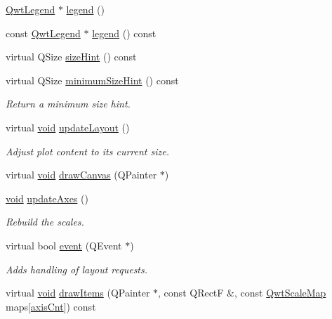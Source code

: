 \begin{DoxyCompactItemize}
\hyperlink{class_qwt_legend}{Qwt\-Legend} $\ast$ \hyperlink{class_qwt_plot_aab1f2cf0e567e09a4c4bce3181c03ba0}{legend} ()
\item 
const \hyperlink{class_qwt_legend}{Qwt\-Legend} $\ast$ \hyperlink{class_qwt_plot_a9635345324c02f9dd15980bf25804423}{legend} () const 
\item 
virtual Q\-Size \hyperlink{class_qwt_plot_a8e25bdd9b085344227a7f9e218ce557c}{size\-Hint} () const 
\item 
virtual Q\-Size \hyperlink{class_qwt_plot_a5a17d0ea2e9a977d48045e742f5b8cfd}{minimum\-Size\-Hint} () const 
\begin{DoxyCompactList}\small\item\em Return a minimum size hint. \end{DoxyCompactList}\item 
virtual \hyperlink{group___u_a_v_objects_plugin_ga444cf2ff3f0ecbe028adce838d373f5c}{void} \hyperlink{class_qwt_plot_ad470068832406086d6823109d8d7f050}{update\-Layout} ()
\begin{DoxyCompactList}\small\item\em Adjust plot content to its current size. \end{DoxyCompactList}\item 
virtual \hyperlink{group___u_a_v_objects_plugin_ga444cf2ff3f0ecbe028adce838d373f5c}{void} \hyperlink{class_qwt_plot_add1b88d8312e2671652d23f8181f2433}{draw\-Canvas} (Q\-Painter $\ast$)
\item 
\hyperlink{group___u_a_v_objects_plugin_ga444cf2ff3f0ecbe028adce838d373f5c}{void} \hyperlink{class_qwt_plot_a1fb2dbc3697a66024d48c08b1d18f8a5}{update\-Axes} ()
\begin{DoxyCompactList}\small\item\em Rebuild the scales. \end{DoxyCompactList}\item 
virtual bool \hyperlink{class_qwt_plot_af40d1bfdd9b6cd94e9981db8b254b961}{event} (Q\-Event $\ast$)
\begin{DoxyCompactList}\small\item\em Adds handling of layout requests. \end{DoxyCompactList}\item 
virtual \hyperlink{group___u_a_v_objects_plugin_ga444cf2ff3f0ecbe028adce838d373f5c}{void} \hyperlink{class_qwt_plot_a97be5b6d98b88053883cc26e4cedec8e}{draw\-Items} (Q\-Painter $\ast$, const Q\-Rect\-F \&, const \hyperlink{class_qwt_scale_map}{Qwt\-Scale\-Map} maps\mbox{[}\hyperlink{class_qwt_plot_a81df699dcf9dde0752c0726b5f31e271aea62036dfd48ee0f9450718592614892}{axis\-Cnt}\mbox{]}) const 
\end{DoxyCompactItemize}
